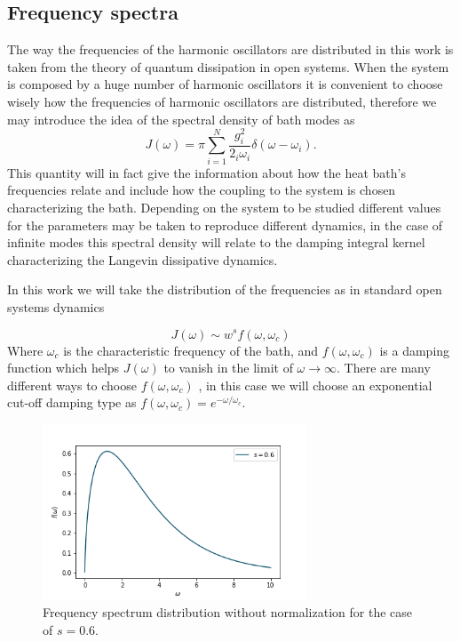 \subsection{Frequency spectra}
The way the frequencies of the harmonic oscillators are distributed in this work is taken from the theory of quantum dissipation in open systems.  When the system is composed by a huge number of harmonic oscillators it is convenient to choose wisely how the frequencies of harmonic oscillators are distributed, therefore we may introduce the idea of the spectral density of bath modes as
\begin{equation}
J(\omega) =\pi \sum_{i=1}^N\frac{g_i^2}{2_i\omega_i}\delta (\omega-\omega_i).
\end{equation}
This quantity will in fact give the information about how the heat bath's frequencies relate and include how the coupling to the system is chosen characterizing the bath. Depending on the system to be studied different values for the parameters may be taken to reproduce different dynamics, in the case of infinite modes this spectral density will relate to the damping integral kernel characterizing the Langevin dissipative dynamics.\par 
In this work we will take the distribution of the frequencies as in standard open systems dynamics\cite{leggett1987dynamics} \cite{wang2010coherent}\cite{wang2008coherent}

\begin{equation}
J(\omega) \sim w^s f(\omega,\omega_c)
\label{eq:spectral_density}
\end{equation}
Where $\omega_c$ is the characteristic frequency of the bath, and $f(\omega,\omega_c)$ is a damping function which helps $J(\omega)$ to vanish in the limit of $\omega \rightarrow \infty$. There are many different ways to choose $f(\omega,\omega_c)$ \cite{wang2008coherent}, in this case we will choose an exponential cut-off damping type as $f(\omega,\omega_c)=e^{-\omega/\omega_c}$.   

\begin{figure}[H]
\centering
\includegraphics[width=0.7\textwidth]{Figures/frequency_spectra.png}
\caption{Frequency spectrum distribution without normalization for the case of $s=0.6$.\label{fig:frequency_spectra}
}
\end{figure} 


